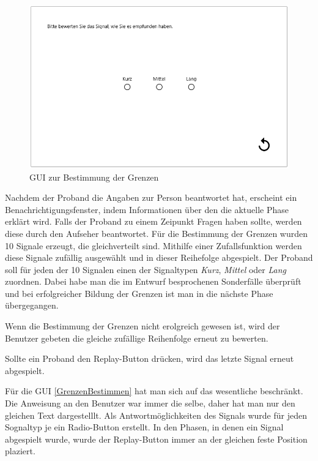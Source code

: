 \begin{figure}
	\centering
    \includegraphics[width=\textwidth]{pics/gui/GrenzenBestimmen.png}
    \caption{GUI zur Bestimmung der Grenzen}
    \label{fig:GrenzenBestimmen}
\end{figure}

Nachdem der Proband die Angaben zur Person beantwortet hat, erscheint ein Benachrichtigungsfenster, indem Informationen {\"u}ber den die aktuelle Phase erkl{\"a}rt wird. 
Falls der Proband zu einem Zeipunkt Fragen haben sollte, werden diese durch den Aufseher beantwortet.
F{\"u}r die Bestimmung der Grenzen wurden 10 Signale erzeugt, die gleichverteilt sind. 
Mithilfe einer Zufallsfunktion werden diese Signale zuf{\"a}llig ausgew{\"a}hlt und in dieser Reihefolge abgespielt. 
Der Proband soll f{\"u}r jeden der 10 Signalen einen der Signaltypen \textit{Kurz}, \textit{Mittel} oder \textit{Lang} zuordnen. 
Dabei habe man die im Entwurf besprochenen Sonderf{\"a}lle {\"u}berpr{\"u}ft und bei erfolgreicher Bildung der Grenzen ist man in die n{\"a}chste Phase {\"u}bergegangen.

Wenn die Bestimmung der Grenzen nicht erolgreich gewesen ist, wird der Benutzer gebeten die gleiche zuf{\"a}llige Reihenfolge erneut zu bewerten. 

Sollte ein Proband den Replay-Button dr{\"u}cken, wird das letzte Signal erneut abgespielt.

F{\"u}r die GUI \autoref{GrenzenBestimmen} hat man sich auf das wesentliche beschr{\"a}nkt. Die Anweisung an den Benutzer war immer die selbe, daher hat man nur den gleichen Text dargestelllt. Als Antwortm{\"o}glichkeiten des Signals wurde für jeden Sognaltyp je ein Radio-Button erstellt. 
In den Phasen, in denen ein Signal abgespielt wurde, wurde der Replay-Button immer an der gleichen feste Position plaziert. 


